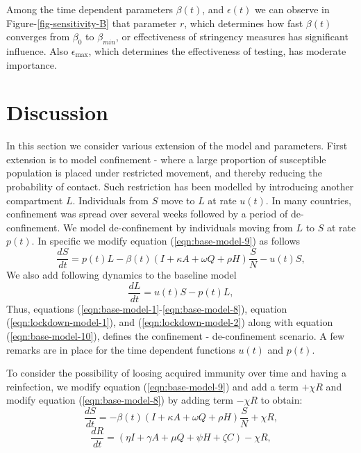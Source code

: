 \documentclass[10pt]{wlscirep}
\begin{document}
Among the time dependent parameters $\beta(t)$, and $\epsilon(t)$ we can observe in Figure-\ref{fig-sensitivity-B} that parameter $r$, which determines how fast $\beta(t)$ converges from $\beta_0$ to $\beta_{min}$, or effectiveness of stringency measures has significant influence. Also $\epsilon_{\max}$, which determines the effectiveness of testing, has moderate importance. 

\section*{Discussion}
In this section we consider various extension of the model and parameters. First extension is to model confinement - where a large proportion of susceptible population is placed under restricted movement, and thereby reducing the probability of contact. Such restriction has been modelled by introducing another compartment $L$. Individuals from $S$ move to $L$ at rate $u(t)$. In many countries, confinement was spread over several weeks followed by a period of de-confinement. We model de-confinement by individuals moving from $L$ to $S$ at rate $p(t)$. In specific we modify equation (\ref{eqn:base-model-9}) as follows
\begin{equation}
\frac{dS}{dt} = p(t)L -\beta(t) \left( I + \kappa A + \omega Q + \rho H \right) \frac{S}{N} - u(t)S,
\label{eqn:lockdown-model-1}
\end{equation}
%
%
We also add following dynamics to the baseline model 
\begin{equation}
\frac{dL}{dt} = u(t)S - p(t)L,
\label{eqn:lockdown-model-2}
\end{equation}
Thus, equations (\ref{eqn:base-model-1}-\ref{eqn:base-model-8}), equation (\ref{eqn:lockdown-model-1}), and (\ref{eqn:lockdown-model-2}) along with equation (\ref{eqn:base-model-10}), defines the confinement - de-confinement scenario. A few remarks are in place for the time dependent functions $u(t)$ and $p(t)$.

To consider the possibility of loosing acquired immunity over time and having a reinfection, we modify  equation (\ref{eqn:base-model-9}) and add a term $+\chi R$ and modify equation (\ref{eqn:base-model-8}) by adding term $-\chi R$ to obtain:
%
%
\begin{equation}
\frac{dS}{dt} = -\beta(t) \left( I + \kappa A + \omega Q + \rho H \right) \frac{S}{N} +\chi R,
\label{eqn:loss_immunity-model-8}
\end{equation}
%
%
\begin{equation}
\frac{dR}{dt} =  \left( \eta I +  \gamma A + \mu Q + \psi H + \zeta C \right) -\chi R,
\label{eqn:loss_immunity-model-9}
\end{equation}
%
\end{document}
